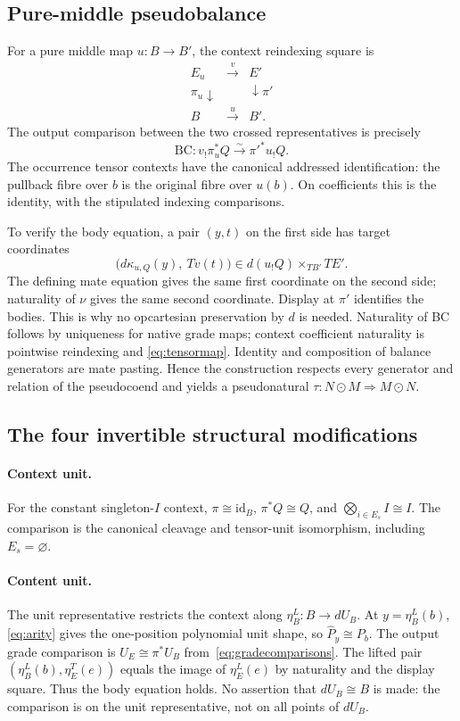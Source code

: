 \documentclass[11pt,a4paper]{article}
\theoremstyle{definition}
\newcommand{\id}{\mathrm{id}}
\begin{document}
\subsection{Pure-middle pseudobalance}
For a pure middle map $u:B\to B'$, the context reindexing square is
\[
 \begin{array}{ccc}
 E_u&\xrightarrow{v}&E'\\
 {\scriptstyle\pi_u}\downarrow&&\downarrow{\scriptstyle\pi'}\\
 B&\xrightarrow{u}&B'.
 \end{array}
\]
The output comparison between the two crossed representatives is precisely
\begin{equation}\label{eq:BC}
 \mathrm{BC}:v_!\pi_u^*Q\xrightarrow{\sim}\pi'^*u_!Q.
\end{equation}
The occurrence tensor contexts have the canonical addressed identification:
the pullback fibre over $b$ is the original fibre over $u(b)$. On coefficients
this is the identity, with the stipulated indexing comparisons.

To verify the body equation, a pair $(y,t)$ on the first side has target
coordinates
\[
 \bigl(d\kappa_{u,Q}(y),\ Tv(t)\bigr)
 \in d(u_!Q)\times_{TB'}TE'.
\]
The defining mate equation gives the same first coordinate on the second
side; naturality of $\nu$ gives the same second coordinate. Display at
$\pi'$ identifies the bodies. This is why no opcartesian preservation by
$d$ is needed. Naturality of BC follows by uniqueness for native grade maps;
context coefficient naturality is pointwise reindexing and
\eqref{eq:tensormap}. Identity and composition of balance generators are mate
pasting. Hence the construction respects every generator and relation of the
pseudocoend and yields a pseudonatural $\tau:N\odot M\Rightarrow M\odot N$.

\subsection{The four invertible structural modifications}
\paragraph{Context unit.}
For the constant singleton-$I$ context, $\pi\cong\id_B$,
$\pi^*Q\cong Q$, and $\bigotimes_{i\in E_s}I\cong I$.
The comparison is the canonical cleavage and tensor-unit isomorphism,
including $E_s=\varnothing$.

\paragraph{Content unit.}
The unit representative restricts the context along
$\eta^L_B:B\to dU_B$. At $y=\eta^L_B(b)$,
\eqref{eq:arity} gives the one-position polynomial unit shape, so
$\widehat P_y\cong P_b$. The output grade comparison is
$U_E\cong\pi^*U_B$ from~\eqref{eq:gradecomparisons}.
The lifted pair $(\eta^L_B(b),\eta^T_E(e))$ equals the image of
$\eta^L_E(e)$ by naturality and the display square. Thus the body equation
holds. No assertion that $dU_B\cong B$ is made: the comparison is on the
unit representative, not on all points of $dU_B$.
\end{document}
